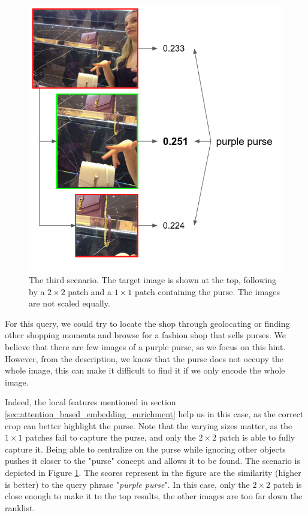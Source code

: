 \begin{figure}[t]
    \centering
    \includegraphics[width=0.7\columnwidth]{content/resources/images/methods/CaseStudy3Overview.png}
    \caption{The third scenario. The target image is shown at the top, following by a $2 \times 2$ patch and a $1 \times 1$ patch containing the purse. The images are not scaled equally. }
    \label{fig:CaseStudy3}
\end{figure}

\vspace{-2mm}
For this query, we could try to locate the shop through geolocating or finding other shopping moments and browse for a fashion shop that sells purses. We believe that there are few images of a purple purse, so we focus on this hint. However, from the description, we know that the purse does not occupy the whole image, this can make it difficult to find it if we only encode the whole image. 

Indeed, the local features mentioned in section \ref{sec:attention_based_embedding_enrichment} help us in this case, as the correct crop can better highlight the purse. Note that the varying sizes matter, as the $1 \times 1$ patches fail to capture the purse, and only the $2 \times 2$ patch is able to fully capture it. Being able to centralize on the purse while ignoring other objects pushes it closer to the "purse" concept and allows it to be found. The scenario is depicted in Figure \ref{fig:CaseStudy3}. The scores represent in the figure are the similarity (higher is better) to the query phrase "\textit{purple purse}". In this case, only the $2 \times 2$ patch is close enough to make it to the top results, the other images are too far down the ranklist. 


